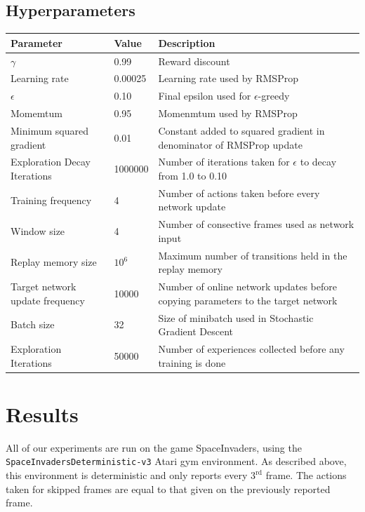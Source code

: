 \documentclass[letterpaper]{article}
\begin{document}
\subsection{Hyperparameters}
\begin{center}
  \begin{tabular}{|l|l|p{9cm}|}
    \hline
    \textbf{Parameter} & \textbf{Value} & \textbf{Description} \\ \hline
    $\gamma$ & 0.99 & Reward discount \\ \hline
    Learning rate & 0.00025 & Learning rate used by RMSProp \\ \hline
    $\epsilon$ & 0.10 & Final epsilon used for $\epsilon$-greedy \\ \hline
    Momemtum & 0.95 & Momenmtum used by RMSProp \\ \hline
    Minimum squared gradient & 0.01 & Constant added to squared gradient in denominator of RMSProp update \\ \hline
    Exploration Decay Iterations & 1000000 & Number of iterations taken for $\epsilon$ to decay from 1.0 to 0.10 \\ \hline
    Training frequency & 4 & Number of actions taken before every network update \\ \hline
    Window size & 4 & Number of consective frames used as network input \\ \hline
    Replay memory size & $10^6$ & Maximum number of transitions held in the replay memory \\ \hline
    Target network update frequency & 10000 & Number of online network updates before copying parameters to the target network \\ \hline
    Batch size & 32 & Size of minibatch used in Stochastic Gradient Descent \\ \hline
    Exploration Iterations & 50000 & Number of experiences collected before any training is done \\\hline
  \end{tabular}
\end{center}
\section{Results}

All of our experiments are run on the game SpaceInvaders, using the \texttt{SpaceInvadersDeterministic-v3} Atari gym environment. As described above, this environment is deterministic and only reports every $3^{\text{rd}}$ frame. The actions taken for skipped frames are equal to that given on the previously reported frame.
\end{document}
